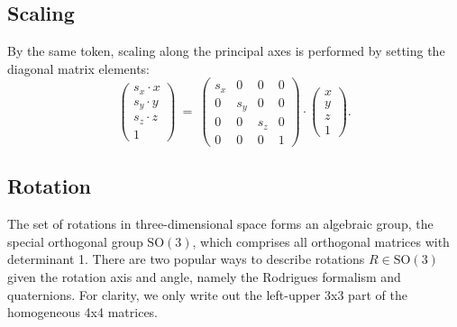\subsection{Scaling}
By the same token, scaling along the principal axes is performed by setting the diagonal matrix elements:
\begin{equation}
	\left( \begin{array}{c} s_x \cdot x \\ s_y \cdot y \\ s_z \cdot z \\ 1 \end{array} \right) 
	\ =\  
	\left( \begin{array}{cccc} 
		s_x & 0 & 0 & 0 \\
		0 & s_y & 0 & 0 \\
		0 & 0 & s_z & 0 \\
		0 & 0 & 0 & 1
	\end{array} \right) \cdot
	\left( \begin{array}{c} x \\ y \\ z \\ 1 \end{array} \right).
\end{equation}


\subsection{Rotation}
The set of rotations in three-dimensional space forms an algebraic group, the special orthogonal group $\mathrm{SO\left(3\right)}$,
which comprises all orthogonal matrices with determinant 1.
There are two popular ways to describe rotations $R \in \mathrm{SO\left(3\right)}$ given the rotation axis and angle, 
namely the Rodrigues formalism and quaternions. 
For clarity, we only write out the left-upper 3x3 part of the homogeneous 4x4 matrices.


